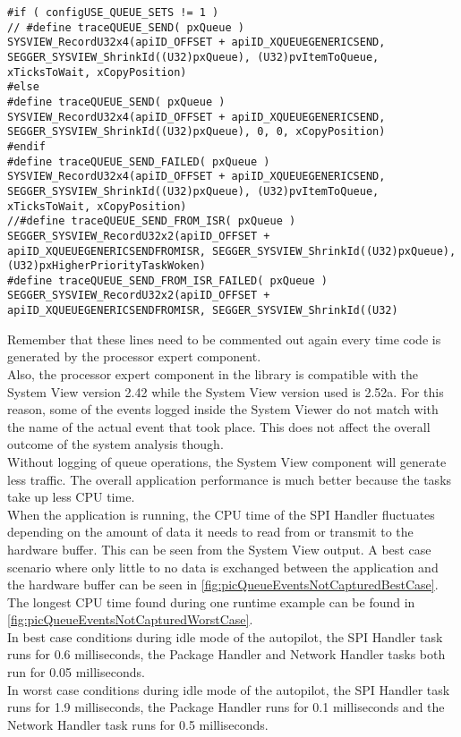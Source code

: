 \begin{lstlisting}
#if ( configUSE_QUEUE_SETS != 1 )
// #define traceQUEUE_SEND( pxQueue )                                    SYSVIEW_RecordU32x4(apiID_OFFSET + apiID_XQUEUEGENERICSEND, SEGGER_SYSVIEW_ShrinkId((U32)pxQueue), (U32)pvItemToQueue, xTicksToWait, xCopyPosition)
#else
#define traceQUEUE_SEND( pxQueue )                                    SYSVIEW_RecordU32x4(apiID_OFFSET + apiID_XQUEUEGENERICSEND, SEGGER_SYSVIEW_ShrinkId((U32)pxQueue), 0, 0, xCopyPosition)
#endif
#define traceQUEUE_SEND_FAILED( pxQueue )                             SYSVIEW_RecordU32x4(apiID_OFFSET + apiID_XQUEUEGENERICSEND, SEGGER_SYSVIEW_ShrinkId((U32)pxQueue), (U32)pvItemToQueue, xTicksToWait, xCopyPosition)
//#define traceQUEUE_SEND_FROM_ISR( pxQueue )                           SEGGER_SYSVIEW_RecordU32x2(apiID_OFFSET + apiID_XQUEUEGENERICSENDFROMISR, SEGGER_SYSVIEW_ShrinkId((U32)pxQueue), (U32)pxHigherPriorityTaskWoken)
#define traceQUEUE_SEND_FROM_ISR_FAILED( pxQueue )                    SEGGER_SYSVIEW_RecordU32x2(apiID_OFFSET + apiID_XQUEUEGENERICSENDFROMISR, SEGGER_SYSVIEW_ShrinkId((U32)
\end{lstlisting}
Remember that these lines need to be commented out again every time code is generated by the processor expert component.\\
Also, the processor expert component in the library is compatible with the System View version 2.42 while the System View version used is 2.52a. For this reason, some of the events logged inside the System Viewer do not match with the name of the actual event that took place. This does not affect the overall outcome of the system analysis though.\\
Without logging of queue operations, the System View component will generate less traffic. The overall application performance is much better because the tasks take up less CPU time.\\
When the application is running, the CPU time of the SPI Handler fluctuates depending on the amount of data it needs to read from or transmit to the hardware buffer. This can be seen from the System View output. A best case scenario where only little to no data is exchanged between the application and the hardware buffer can be seen in \autoref{fig:picQueueEventsNotCapturedBestCase}. The longest CPU time found during one runtime example can be found in \autoref{fig:picQueueEventsNotCapturedWorstCase}.\\
In best case conditions during idle mode of the autopilot, the SPI Handler task runs for 0.6 milliseconds, the Package Handler and Network Handler tasks both run for 0.05 milliseconds.	\\
In worst case conditions during idle mode of the autopilot, the SPI Handler task runs for 1.9 milliseconds, the Package Handler runs for 0.1 milliseconds and the Network Handler task runs for 0.5 milliseconds.
%
%
%
%
%
%
%
